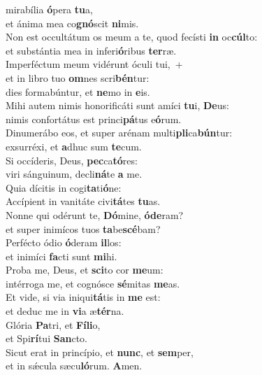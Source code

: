 \oddverse  mirabília \textbf{ó}pera \textbf{tu}a,~\*\\
\oddverse et ánima mea co\textbf{gnó}scit \textbf{ni}mis.\\
\evenverse Non est occultátum os meum a te, quod fecísti \textbf{in} oc\textbf{cúl}to:~\*\\
\evenverse et substántia mea in inferi\textbf{ó}ribus \textbf{ter}ræ.\\
\oddverse Imperféctum meum vidérunt óculi tui,~+\\
\oddverse  et in libro tuo \textbf{om}nes scri\textbf{bén}tur:~\*\\
\oddverse dies formabúntur, et \textbf{ne}mo in \textbf{e}is.\\
\evenverse Mihi autem nimis honorificáti sunt amíci \textbf{tu}i, \textbf{De}us:~\*\\
\evenverse nimis confortátus est princi\textbf{pá}tus e\textbf{ó}rum.\\
\oddverse Dinumerábo eos, et super arénam multi\textbf{pli}ca\textbf{bún}tur:~\*\\
\oddverse exsurréxi, et \textbf{a}dhuc sum \textbf{te}cum.\\
\evenverse Si occíderis, Deus, \textbf{pec}ca\textbf{tó}res:~\*\\
\evenverse viri sánguinum, decli\textbf{ná}te \textbf{a} me.\\
\oddverse Quia dícitis in cogi\textbf{ta}ti\textbf{ó}ne:~\*\\
\oddverse Accípient in vanitáte civi\textbf{tá}tes \textbf{tu}as.\\
\evenverse Nonne qui odérunt te, \textbf{Dó}mine, \textbf{ó}\textbf{de}ram?~\*\\
\evenverse et super inimícos tuos \textbf{ta}be\textbf{scé}bam?\\
\oddverse Perfécto ódio \textbf{ó}deram \textbf{il}los:~\*\\
\oddverse et inimíci \textbf{fa}cti sunt \textbf{mi}hi.\\
\evenverse Proba me, Deus, et \textbf{sci}to cor \textbf{me}um:~\*\\
\evenverse intérroga me, et cognósce \textbf{sé}mitas \textbf{me}as.\\
\oddverse Et vide, si via iniqui\textbf{tá}tis in \textbf{me} est:~\*\\
\oddverse et deduc me in \textbf{vi}a æ\textbf{tér}na.\\
\evenverse Glória \textbf{Pa}tri, et \textbf{Fí}\textbf{li}o,~\*\\
\evenverse et Spi\textbf{rí}tui \textbf{San}cto.\\
\oddverse Sicut erat in princípio, et \textbf{nunc}, et \textbf{sem}per,~\*\\
\oddverse et in sǽcula sæcu\textbf{ló}rum. \textbf{A}men.\\
